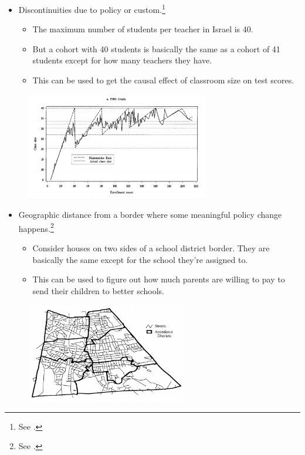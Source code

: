 \documentclass{beamer}
\begin{document}
\begin{frame}
	\begin{itemize}
		\item Discontinuities due to policy or custom.\footnote{See \cite{angrist1999using}.}
		\begin{itemize}
			\item The maximum number of students per teacher in Israel is 40.
			\item But a cohort with 40 students is basically the same as a cohort of 41 students except for how many teachers they have.
			\item This can be used to get the causal effect of classroom size on test scores.
		\end{itemize}
	\end{itemize}
	\begin{figure}
		\includegraphics[width=8cm]{angrist-maimonedes.png}
		\centering
	\end{figure}
\end{frame}

\begin{frame}
	\begin{itemize}
		\item Geographic distance from a border where some meaningful policy change happens.\footnote{See \cite{black1999better}.}
		\begin{itemize}
			\item Consider houses on two sides of a school district border. They are basically the same except for the school they're assigned to.
			\item This can be used to figure out how much parents are willing to pay to send their children to better schools.
		\end{itemize}
	\end{itemize}
	\begin{figure}
		\includegraphics[width=7cm]{black-schools.png}
		\centering
	\end{figure}
\end{frame}
\end{document}
